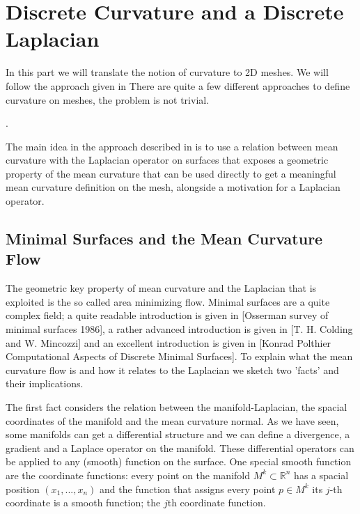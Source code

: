
\section{Discrete Curvature and a Discrete Laplacian}
In this part we will translate the notion of curvature to 2D meshes. We will follow the approach given in  There are quite a few different approaches to define curvature on meshes, the problem is not trivial. 

.

The main idea in the approach described in  is to use a relation between mean curvature with the Laplacian operator on surfaces that exposes a geometric property of the mean curvature that can be  used directly to get a meaningful mean curvature definition on the mesh, alongside a motivation for a Laplacian operator.

\subsection{Minimal Surfaces and the Mean Curvature Flow}
The geometric key property of mean curvature and the Laplacian that is exploited is the so called area minimizing flow. Minimal surfaces are a quite complex field; a quite readable introduction is given in [Osserman survey of minimal surfaces 1986], a rather advanced introduction is given in [T. H. Colding and W. Mincozzi] and an excellent introduction is given in [Konrad Polthier Computational Aspects of Discrete Minimal Surfaces]. To explain what the mean curvature flow is and how it relates to the Laplacian we sketch two 'facts' and their implications.

The first fact considers the relation between the manifold-Laplacian, the spacial coordinates of the manifold and the mean curvature normal. As we have seen, some manifolds can get a differential structure and we can define a divergence, a gradient and a Laplace operator on the manifold. These differential operators can be applied to any (smooth) function on the surface. One special smooth function are the coordinate functions: every point on the manifold $M^k \subset \mathbb R^n$ has a spacial position $(x_1,...,x_n)$ and the function that assigns every point $p\in M^k$ its $j$-th coordinate is a smooth function; the $j$th coordinate function. 

